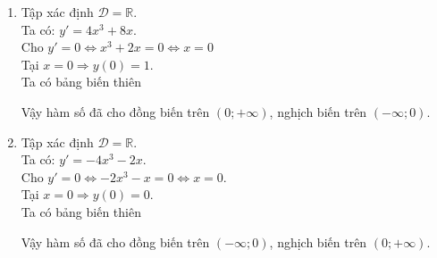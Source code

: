 \begin{vd}
{\begin{enumerate}
\begin{center}
            \end{center}
            Vậy hàm số đã cho đồng biến trên $(-1;0)$, $(1;+\infty)$, nghịch biến trên $(-\infty,-1), (0;1)$.
            \item
            Tập xác định $\mathscr{D}=\mathbb{R}$.\\
            Ta có: $y'=4x^3+8x$.\\
            Cho $y'=0 \Leftrightarrow x^3+2x=0 \Leftrightarrow x=0$\\
            Tại $x=0 \Rightarrow y(0)=1$.\\
            Ta có bảng biến thiên
            \begin{center}
            \end{center}
            Vậy hàm số đã cho đồng biến trên $(0;+\infty)$, nghịch biến trên $(-\infty;0)$.
            \item
            Tập xác định $\mathscr{D}=\mathbb{R}$.\\
            Ta có: $y'=-4x^3-2x$.\\
            Cho $y'=0 \Leftrightarrow -2x^3-x = 0 \Leftrightarrow x=0$.\\
            Tại $x=0 \Rightarrow y(0)=0$.\\
            Ta có bảng biến thiên
            \begin{center}
            \end{center}
            Vậy hàm số đã cho đồng biến trên $(-\infty;0)$, nghịch biến trên $(0;+\infty)$.
        \end{enumerate}
    }
\end{vd}
